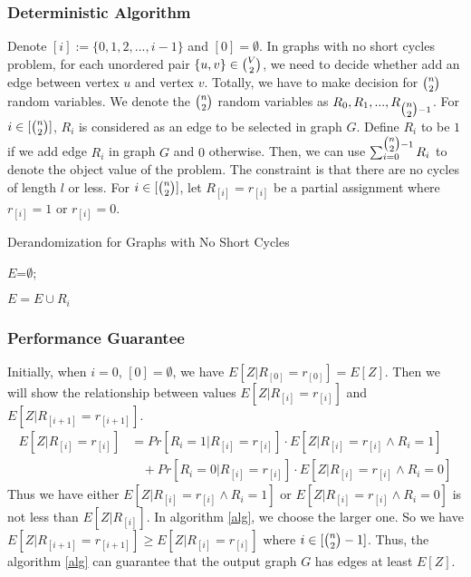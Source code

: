 \subsubsection{Deterministic Algorithm}
Denote $[i]:=\{0,1,2,...,i-1\}$ and $[0]=\emptyset$.
In graphs with no short cycles problem, for each unordered pair $\{u, v\} \in \tbinom{V}{2}$, we need to decide whether add an edge between vertex $u$ and vertex $v$. 
Totally, we have to make decision for $\tbinom{n}{2}$ random variables.
We denote the $\tbinom{n}{2}$ random variables as $R_0, R_1, ..., R_{\tbinom{n}{2}-1}$. %
For $i\in [\tbinom{n}{2}]$, $R_i$ is considered as an edge to be selected in graph $G$.
Define $R_i$ to be $1$ if we add edge $R_i$ in graph $G$ and $0$ otherwise. 
Then, we can use $\sum_{i=0}^{\tbinom{n}{2}-1}R_i$ to denote the object value of the problem. The constraint is that there are no cycles of length $l$ or less.
For $i\in [\tbinom{n}{2}]$, let $R_{[i]}=r_{[i]}$ be a partial assignment where $r_{[i]}=1$ or $r_{[i]}=0$.
\begin{algorithm}
    \caption{Derandomization for Graphs with No Short Cycles}\label{alg}
    {
        $E$=$\emptyset$;

        {
            {
               $ E=E\cup R_i$
            }
        
        }
    }
\end{algorithm}
\subsubsection{Performance Guarantee}

Initially, when $i=0$, $[0]=\emptyset$, we have $E[Z|R_{[0]}=r_{[0]}]=E[Z]$.
Then we will show the relationship between values $E[Z|R_{[i]}=r_{[i]}]$ and  $E[Z|R_{[i+1]}=r_{[i+1]}]$. 
\begin{align}
    \nonumber E[Z|R_{[i]}=r_{[i]}]&=Pr[R_i=1|R_{[i]}=r_{[i]}]\cdot E[Z|R_{[i]}=r_{[i]}\wedge R_i=1]\\
    \nonumber &~~~~+Pr[R_i=0|R_{[i]}=r_{[i]}]\cdot E[Z|R_{[i]}=r_{[i]}\wedge R_i=0]
\end{align}
Thus we have either $E[Z|R_{[i]}=r_{[i]}\wedge R_i=1]$ or $E[Z|R_{[i]}=r_{[i]}\wedge R_i=0]$ is not less than  $E[Z|R_{[i]}] $. In algorithm \ref{alg}, we choose the larger one. So we have $E[Z|R_{[i+1]}=r_{[i+1]}] \ge E[Z|R_{[i]}=r_{[i]}]$ where $i\in [\tbinom{n}{2}-1]$.
Thus, the algorithm \ref{alg} can guarantee that the output graph $G$ has edges at least $E[Z]$.

